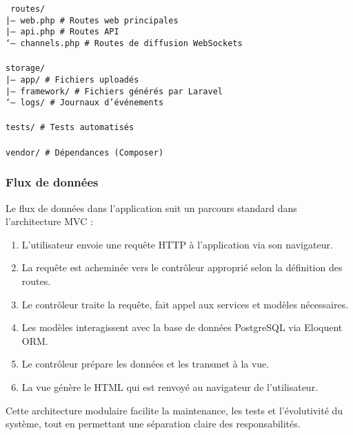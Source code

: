 \begin{tcolorbox}[colback=black!5!white, colframe=black!75!white, title=Fin de la structure du projet OptiHR, fonttitle=\bfseries]
    \texttt{
        routes/ \\
        |-- web.php           \quad \# Routes web principales \\
        |-- api.php           \quad \# Routes API \\
        `-- channels.php      \quad \# Routes de diffusion WebSockets \\
        \\
        storage/ \\
        |-- app/              \quad \# Fichiers uploadés \\
        |-- framework/        \quad \# Fichiers générés par Laravel \\
        `-- logs/             \quad \# Journaux d'événements \\
        \\
        tests/                \quad \# Tests automatisés \\
        \\
        vendor/               \quad \# Dépendances (Composer) \\
    }
\end{tcolorbox}

\subsubsection{Flux de données}
Le flux de données dans l'application suit un parcours standard dans
l'architecture MVC :

\begin{enumerate}
    \item L'utilisateur envoie une requête HTTP à l'application via son navigateur.
    \item La requête est acheminée vers le contrôleur approprié selon la définition des
          routes.
    \item Le contrôleur traite la requête, fait appel aux services et modèles
          nécessaires.
    \item Les modèles interagissent avec la base de données PostgreSQL via Eloquent ORM.
    \item Le contrôleur prépare les données et les transmet à la vue.
    \item La vue génère le HTML qui est renvoyé au navigateur de l'utilisateur.
\end{enumerate}

Cette architecture modulaire facilite la maintenance, les tests et
l'évolutivité du système, tout en permettant une séparation claire des
responsabilités.
\clearpage